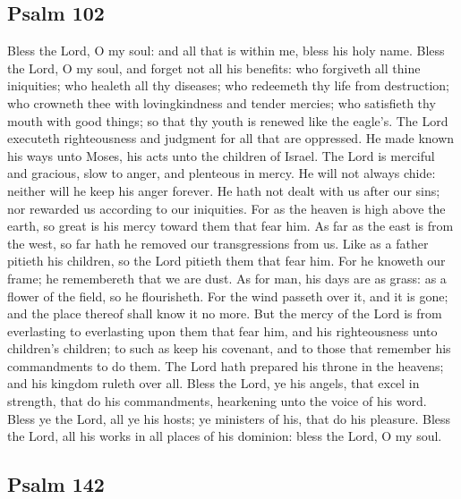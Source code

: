 \subsection{Psalm 102}

Bless the Lord, O my soul: and all that is within me, bless his holy name. Bless the Lord, O my soul, and forget not all his benefits: who forgiveth all thine iniquities; who healeth all thy diseases; who redeemeth thy life from destruction; who crowneth thee with lovingkindness and tender mercies; who satisfieth thy mouth with good things; so that thy youth is renewed like the eagle's. The Lord executeth righteousness and judgment for all that are oppressed. He made known his ways unto Moses, his acts unto the children of Israel. The Lord is merciful and gracious, slow to anger, and plenteous in mercy. He will not always chide: neither will he keep his anger forever. He hath not dealt with us after our sins; nor rewarded us according to our iniquities. For as the heaven is high above the earth, so great is his mercy toward them that fear him. As far as the east is from the west, so far hath he removed our transgressions from us. Like as a father pitieth his children, so the Lord pitieth them that fear him. For he knoweth our frame; he remembereth that we are dust. As for man, his days are as grass: as a flower of the field, so he flourisheth. For the wind passeth over it, and it is gone; and the place thereof shall know it no more. But the mercy of the Lord is from everlasting to everlasting upon them that fear him, and his righteousness unto children's children; to such as keep his covenant, and to those that remember his commandments to do them. The Lord hath prepared his throne in the heavens; and his kingdom ruleth over all. Bless the Lord, ye his angels, that excel in strength, that do his commandments, hearkening unto the voice of his word. Bless ye the Lord, all ye his hosts; ye ministers of his, that do his pleasure. Bless the Lord, all his works in all places of his dominion: bless the Lord, O my soul.

\subsection{Psalm 142}

